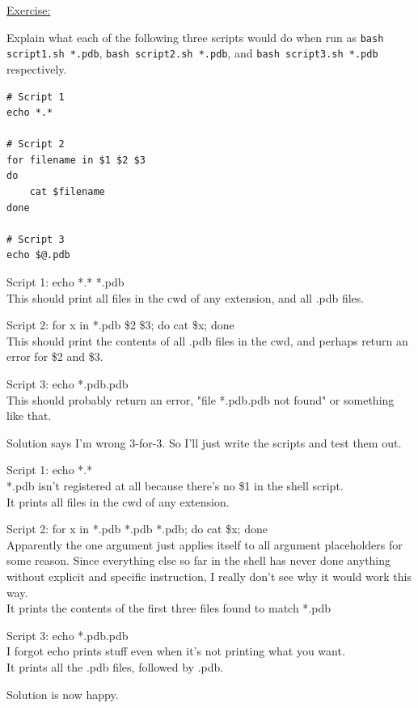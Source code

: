 \documentclass[12pt]{article}
\begin{document}
\begin{addmargin}[1cm]{0cm}
\color{gray}
\underline{Exercise:}

Explain what each of the following three scripts would do when run as \texttt{bash script1.sh *.pdb}, \texttt{bash script2.sh *.pdb}, and \texttt{bash script3.sh *.pdb} respectively.

\vspace{-1em}\begin{verbatim}
# Script 1
echo *.*

# Script 2
for filename in $1 $2 $3
do
    cat $filename
done

# Script 3
echo $@.pdb
\end{verbatim}

\color{black}\vspace{-0.5em}
Script 1: echo *.* *.pdb
\\This should print all files in the cwd of any extension, and all .pdb files.

Script 2: for x in *.pdb \$2 \$3; do cat \$x; done
\\This should print the contents of all .pdb files in the cwd, and perhaps return an error for \$2 and \$3.

Script 3: echo *.pdb.pdb
\\This should probably return an error, "file *.pdb.pdb not found" or something like that.

Solution says I'm wrong 3-for-3. So I'll just write the scripts and test them out.

\vspace{1em}
Script 1: echo *.*
\\*.pdb isn't registered at all because there's no \$1 in the shell script.
\\It prints all files in the cwd of any extension.

Script 2: for x in *.pdb *.pdb *.pdb; do cat \$x; done
\\Apparently the one argument just applies itself to all argument placeholders for some reason. Since everything else so far in the shell has never done anything without explicit and specific instruction, I really don't see why it would work this way.
\\It prints the contents of the first three files found to match *.pdb

Script 3: echo *.pdb.pdb
\\I forgot echo prints stuff even when it's not printing what you want.
\\It prints all the .pdb files, followed by .pdb.

Solution is now happy.
\end{addmargin}
\end{document}
